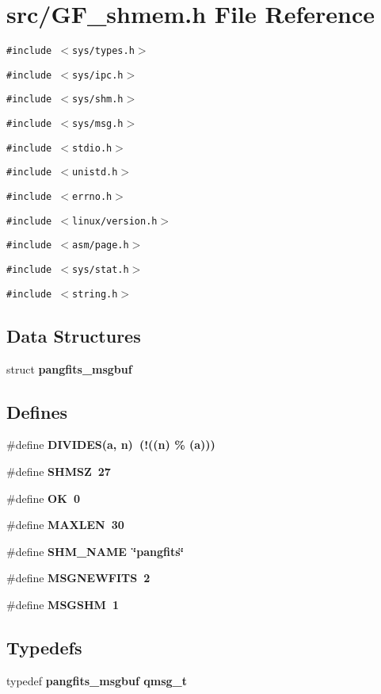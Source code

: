 \section{src/GF\_\-shmem.h File Reference}
\label{GF__shmem_8h}
{\tt \#include $<$sys/types.h$>$}\par
{\tt \#include $<$sys/ipc.h$>$}\par
{\tt \#include $<$sys/shm.h$>$}\par
{\tt \#include $<$sys/msg.h$>$}\par
{\tt \#include $<$stdio.h$>$}\par
{\tt \#include $<$unistd.h$>$}\par
{\tt \#include $<$errno.h$>$}\par
{\tt \#include $<$linux/version.h$>$}\par
{\tt \#include $<$asm/page.h$>$}\par
{\tt \#include $<$sys/stat.h$>$}\par
{\tt \#include $<$string.h$>$}\par
\subsection*{Data Structures}
\begin{CompactItemize}
\item 
struct \bf{pangfits\_\-msgbuf}
\end{CompactItemize}
\subsection*{Defines}
\begin{CompactItemize}
\item 
\#define \bf{DIVIDES}(a, \bf{n})~(!((\bf{n}) \% (a)))
\item 
\#define \bf{SHMSZ}~27
\item 
\#define \bf{OK}~0
\item 
\#define \bf{MAXLEN}~30
\item 
\#define \bf{SHM\_\-NAME}~\char`\"{}pangfits\char`\"{}
\item 
\#define \bf{MSGNEWFITS}~2
\item 
\#define \bf{MSGSHM}~1
\end{CompactItemize}
\subsection*{Typedefs}
\begin{CompactItemize}
\item 
typedef \bf{pangfits\_\-msgbuf} \bf{qmsg\_\-t}
\end{CompactItemize}
